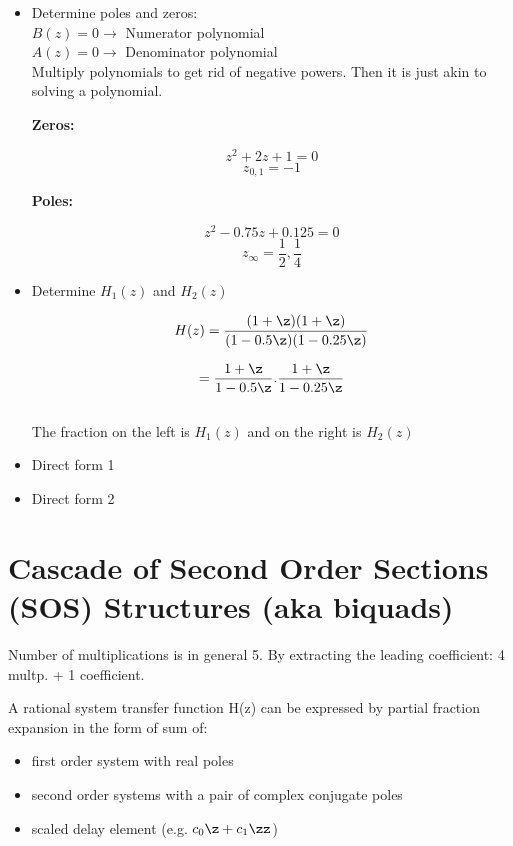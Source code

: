 \begin{itemize}
	\item Determine poles and zeros:\\

	$B(z) = 0 \rightarrow$ Numerator polynomial\\
	$A(z) = 0 \rightarrow$ Denominator polynomial\\

	Multiply polynomials to get rid of negative powers. Then it is just akin to solving a polynomial.
	\newpage

	\textbf{\color{Red} Zeros:}

	$$z^2 + 2z + 1 = 0$$
	$$ z_{0,1} = -1$$

	\textbf{\color{Red} Poles:}

	$$z^2 -0.75z + 0.125 = 0$$
	$$ z_{\infty} = \frac{1}{2}, \frac{1}{4}$$

	\item Determine {\color{Red} $H_1(z)$ and $H_2(z)$}

	$$ H(z) = \frac{(1+\z)(1+\z)}{(1-0.5\z)(1-0.25\z)} $$

	$$ = \frac{1+\z}{1-0.5\z} . \frac{1+\z}{1-0.25\z} $$\\

	The fraction on the left is $H_1(z)$ and on the right is $H_2(z)$\\

	\item Direct form 1

	\item Direct form 2

\end{itemize}

\section{Cascade of Second Order Sections (SOS) Structures (aka biquads)}

Number of multiplications is in general 5. By extracting the leading coefficient: 4 multp. + 1 coefficient.

A rational system transfer function H(z) can be expressed by partial fraction expansion in the form of sum of:
\begin{itemize}
	\item first order system with real poles
	\item second order systems with a pair of complex conjugate poles
	\item scaled delay element (e.g. $c_0\z + c_1\zz$)
\end{itemize}

